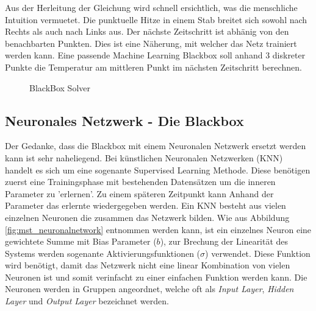 	Aus der Herleitung der Gleichung wird schnell ersichtlich, was die menschliche Intuition vermuetet. Die punktuelle Hitze in einem Stab breitet sich sowohl nach Rechts als auch nach Links aus. Der nächste Zeitschritt ist abhänig von den benachbarten Punkten. Dies ist eine Näherung, mit welcher das Netz trainiert werden kann. Eine passende Machine Learning Blackbox soll anhand 3 diskreter Punkte die Temperatur am mittleren Punkt im nächsten Zeitschritt berechnen.
	\begin{figure}[h]
		\centering
		
		\label{fig:mst_blackBoxSolver}
		\caption{BlackBox Solver}
	\end{figure}
	
	\subsection{Neuronales Netzwerk - Die Blackbox}
	
	Der Gedanke, dass die Blackbox mit einem Neuronalen Netzwerk ersetzt werden kann ist sehr naheliegend. Bei künstlichen Neuronalen Netzwerken (KNN) handelt es sich um eine sogenante Supervised Learning Methode. Diese benötigen zuerst eine Trainingsphase mit bestehenden Datensätzen um die inneren Parameter zu 'erlernen'. Zu einem späteren Zeitpunkt kann Anhand der Parameter das erlernte wiedergegeben werden. Ein KNN besteht aus vielen einzelnen Neuronen die zusammen das Netzwerk bilden. Wie aus Abbildung \ref{fig:mst_neuronalnetwork} entnommen werden kann, ist ein einzelnes Neuron eine gewichtete Summe mit Bias Parameter ($b$), zur Brechung der Linearität des Systems werden sogenante Aktivierungsfunktionen ($\sigma$) verwendet. Diese Funktion wird benötigt, damit das Netzwerk nicht eine linear Kombination von vielen Neuronen ist und somit verinfacht zu einer einfachen Funktion werden kann. Die Neuronen werden in Gruppen angeordnet, welche oft als \textit{Input Layer}, \textit{Hidden Layer} und \textit{Output Layer} bezeichnet werden. 
	
